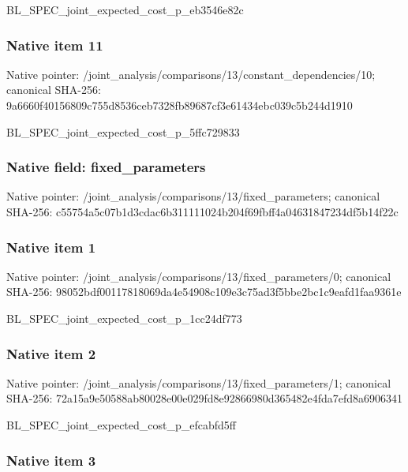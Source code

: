 \documentclass[10pt,a4paper]{article}
\begin{document}
BL\_SPEC\_joint\_expected\_c\allowbreak{}ost\_p\_eb3546e82c


\subsubsection{Native item 11}


Native pointer: /joint\_analysis/comparis\allowbreak{}ons/13/constant\_dependen\allowbreak{}cies/10; canonical SHA-256: 9a6660f40156809c755d8536\allowbreak{}ceb7328fb89687cf3e61434e\allowbreak{}bc039c5b244d1910


BL\_SPEC\_joint\_expected\_c\allowbreak{}ost\_p\_5ffc729833


\subsubsection{Native field: fixed\_parameters}


Native pointer: /joint\_analysis/comparis\allowbreak{}ons/13/fixed\_parameters; canonical SHA-256: c55754a5c07b1d3cdac6b311\allowbreak{}111024b204f69fbff4a04631\allowbreak{}847234df5b14f22c



\subsubsection{Native item 1}


Native pointer: /joint\_analysis/comparis\allowbreak{}ons/13/fixed\_parameters/\allowbreak{}0; canonical SHA-256: 98052bdf00117818069da4e5\allowbreak{}4908c109e3c75ad3f5bbe2bc\allowbreak{}1c9eafd1faa9361e


BL\_SPEC\_joint\_expected\_c\allowbreak{}ost\_p\_1cc24df773


\subsubsection{Native item 2}


Native pointer: /joint\_analysis/comparis\allowbreak{}ons/13/fixed\_parameters/\allowbreak{}1; canonical SHA-256: 72a15a9e50588ab80028e00e\allowbreak{}029fd8e92866980d365482e4\allowbreak{}fda7efd8a6906341


BL\_SPEC\_joint\_expected\_c\allowbreak{}ost\_p\_efcabfd5ff


\subsubsection{Native item 3}
\end{document}
